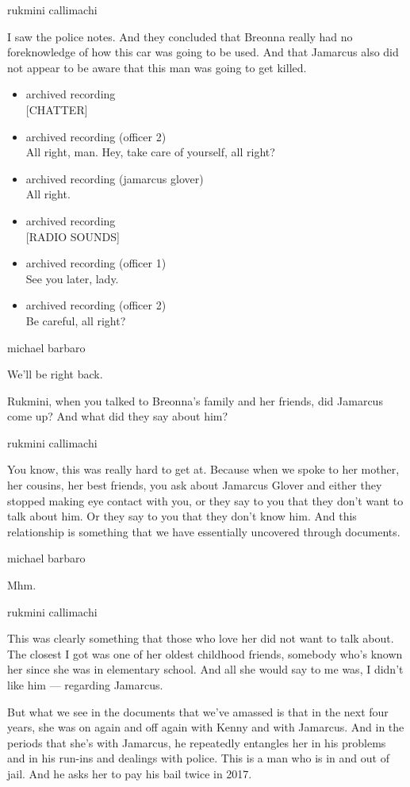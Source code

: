 rukmini callimachi

I saw the police notes. And they concluded that Breonna really had no
foreknowledge of how this car was going to be used. And that Jamarcus
also did not appear to be aware that this man was going to get killed.

\begin{itemize}
\item
  archived recording\\
  {[}CHATTER{]}
\item
  archived recording (officer 2)\\
  All right, man. Hey, take care of yourself, all right?
\item
  archived recording (jamarcus glover)\\
  All right.
\item
  archived recording\\
  {[}RADIO SOUNDS{]}
\item
  archived recording (officer 1)\\
  See you later, lady.
\item
  archived recording (officer 2)\\
  Be careful, all right?
\end{itemize}

michael barbaro

We'll be right back.

Rukmini, when you talked to Breonna's family and her friends, did
Jamarcus come up? And what did they say about him?

rukmini callimachi

You know, this was really hard to get at. Because when we spoke to her
mother, her cousins, her best friends, you ask about Jamarcus Glover and
either they stopped making eye contact with you, or they say to you that
they don't want to talk about him. Or they say to you that they don't
know him. And this relationship is something that we have essentially
uncovered through documents.

michael barbaro

Mhm.

rukmini callimachi

This was clearly something that those who love her did not want to talk
about. The closest I got was one of her oldest childhood friends,
somebody who's known her since she was in elementary school. And all she
would say to me was, I didn't like him --- regarding Jamarcus.

But what we see in the documents that we've amassed is that in the next
four years, she was on again and off again with Kenny and with Jamarcus.
And in the periods that she's with Jamarcus, he repeatedly entangles her
in his problems and in his run-ins and dealings with police. This is a
man who is in and out of jail. And he asks her to pay his bail twice in
2017.

